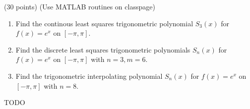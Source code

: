 \documentclass[10pt]{jhwhw}
\begin{document}
\problem{} (30 points) (Use MATLAB routines on classpage)

	\begin{enumerate}
		\item Find the continous least squares trigonometric polynomial $S_3(x)$ for
			$f(x) = e^x$ on $[-\pi,\pi]$.
		\item Find the discrete least squares trigonometric polynomials $S_n(x)$ for
			$f(x) = e^x$ on $[-\pi, \pi]$ with $n=3, m=6$.
		\item Find the trigonometric interpolating polynomial $S_n(x)$ for 
			$f(x) = e^x$ on $[-\pi, \pi]$ with $n=8$.
	\end{enumerate}

\solution

	TODO
\end{document}
